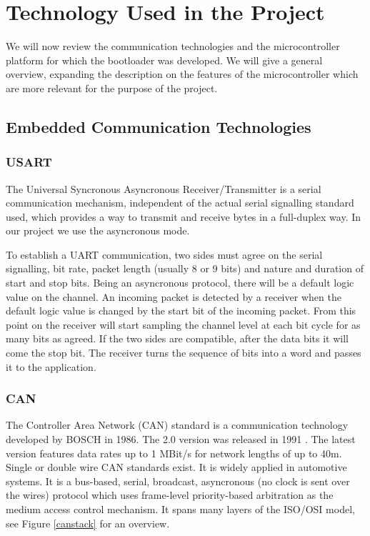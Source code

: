 \documentclass[11pt]{article} %
\begin{document}

\section{Technology Used in the Project}
We will now review the communication technologies and the microcontroller platform for which the bootloader was developed. We will give a general overview, expanding the description on the features of the microcontroller which are more relevant for the purpose of the project.

\subsection{Embedded Communication Technologies}

\subsubsection{USART}

The Universal Syncronous Asyncronous Receiver/Transmitter is a serial communication mechanism, independent of the actual serial signalling standard used, which provides a way to transmit and receive bytes in a full-duplex way. In our project we use the asyncronous mode.

To establish a UART communication, two sides must agree on the serial signalling, bit rate, packet length (usually 8 or 9 bits) and nature and duration of start and stop bits. Being an asyncronous protocol, there will be a default logic value on the channel. An incoming packet is detected by a receiver when the default logic value is changed by the start bit of the incoming packet. From this point on the receiver will start sampling the channel level at each bit cycle for as many bits as agreed. If the two sides are compatible, after the data bits it will come the stop bit. The receiver turns the sequence of bits into a word and passes it to the application.

\subsubsection{CAN}

The Controller Area Network (CAN) standard is a communication technology developed by BOSCH in 1986. The 2.0 version was released in 1991 \cite{ref:canspec}. The latest version features data rates up to 1 MBit/s for network lengths of up to 40m. Single or double wire CAN standards exist. It is widely applied in automotive systems. It is a bus-based, serial, broadcast, asyncronous (no clock is sent over the wires) protocol which uses frame-level priority-based arbitration as the medium access control mechanism. It spans many layers of the ISO/OSI model, see Figure \ref{canstack} for an overview. 
\end{document}
